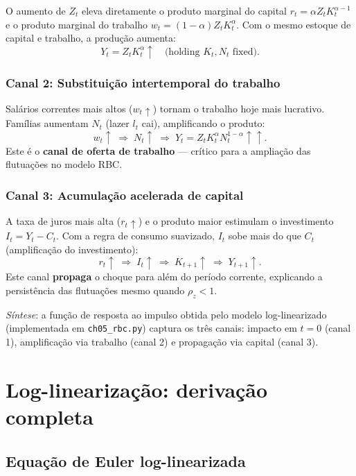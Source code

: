 \documentclass[11pt,a4paper]{article}
\begin{document}
O aumento de $Z_t$ eleva diretamente o produto marginal do capital
$r_t = \alpha Z_t K_t^{\alpha-1}$ e o produto marginal do trabalho
$w_t = (1-\alpha)Z_t K_t^{\alpha}$.
Com o mesmo estoque de capital e trabalho, a produção aumenta:
\[
  Y_t = Z_t K_t^{\alpha} \uparrow \quad \text{(holding } K_t, N_t \text{ fixed)}.
\]

\subsubsection*{Canal 2: Substituição intertemporal do trabalho}

Salários correntes mais altos ($w_t \uparrow$) tornam o trabalho hoje
mais lucrativo. Famílias aumentam $N_t$ (lazer $l_t$ cai),
amplificando o produto:
\[
  w_t \uparrow \;\Longrightarrow\; N_t \uparrow \;\Longrightarrow\;
  Y_t = Z_t K_t^{\alpha} N_t^{1-\alpha} \uparrow\uparrow.
\]
Este é o \textbf{canal de oferta de trabalho} --- crítico para a ampliação
das flutuações no modelo RBC.

\subsubsection*{Canal 3: Acumulação acelerada de capital}

A taxa de juros mais alta ($r_t \uparrow$) e o produto maior estimulam o
investimento $I_t = Y_t - C_t$. Com a regra de consumo suavizado,
$I_t$ sobe mais do que $C_t$ (amplificação do investimento):
\[
  r_t \uparrow \;\Longrightarrow\; I_t \uparrow \;\Longrightarrow\;
  K_{t+1} \uparrow \;\Longrightarrow\; Y_{t+1} \uparrow.
\]
Este canal \textbf{propaga} o choque para além do período corrente,
explicando a persistência das flutuações mesmo quando $\rho_z < 1$.

\bigskip
\noindent\textit{Síntese}: a função de resposta ao impulso obtida pelo modelo
log-linearizado (implementada em \texttt{ch05\_rbc.py}) captura os três canais:
impacto em $t=0$ (canal 1), amplificação via trabalho (canal 2) e propagação
via capital (canal 3).

\section{Log-linearização: derivação completa}

\subsection{Equação de Euler log-linearizada}
\end{document}
